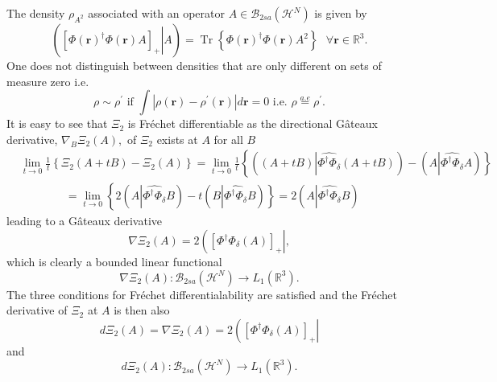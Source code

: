 \documentclass[aps,preprint]{revtex4}%
\begin{document}
The density $\rho_{A^{2}}$ associated with an operator $A\in\mathcal{B}%
_{2sa}\left(  \mathcal{H}^{N}\right)  $ is given by
\begin{equation}
\left(  \left.  \left[  \Phi\left(  \boldsymbol{r}\right)  ^{\dagger}%
\Phi\left(  \boldsymbol{r}\right)  A\right]  _{+}\right\vert A\right)
=\operatorname{Tr}\left\{  \Phi\left(  \boldsymbol{r}\right)  ^{\dagger}%
\Phi\left(  \boldsymbol{r}\right)  A^{2}\right\}  \text{ }\forall
\boldsymbol{r\in}\mathbb{R}^{3}.
\end{equation}
One does not distinguish between densities that are only different on sets of
measure zero i.e.
\begin{equation}
\rho\sim\rho^{\prime}\text{ if }\int\left\vert \rho\left(  \boldsymbol{r}%
\right)  -\rho^{\prime}\left(  \boldsymbol{r}\right)  \right\vert
d\boldsymbol{r}=0\text{ i.e. }\rho\overset{a.e}{=}\rho^{\prime}.
\end{equation}
It is easy to see that $\Xi_{2}$ is Fr\'{e}chet differentiable as the
directional G\^{a}teaux derivative, $\nabla_{B}\Xi_{2}\left(  A\right)  ,$ of
$\Xi_{2}$ exists at $A$ for all $B$
\begin{align}
&  \lim_{t\rightarrow0}\frac{1}{t}\left\{  \Xi_{2}\left(  A+tB\right)
-\Xi_{2}\left(  A\right)  \right\}  =\lim_{t\rightarrow0}\frac{1}{t}\left\{
\left(  \left(  A+tB\right)  \left\vert \widehat{\Phi^{\dagger}\Phi_{\delta}%
}\left(  A+tB\right)  \right.  \right)  -\left(  A\left\vert \widehat{\Phi
^{\dagger}\Phi_{\delta}}A\right.  \right)  \right\} \nonumber\\
&  \left.  \qquad\qquad=\right.  \lim_{t\rightarrow0}\left\{  2\left(
A\left\vert \widehat{\Phi^{\dagger}\Phi_{\delta}}B\right.  \right)  -t\left(
B\left\vert \widehat{\Phi^{\dagger}\Phi_{\delta}}B\right.  \right)  \right\}
=2\left(  A\left\vert \widehat{\Phi^{\dagger}\Phi_{\delta}}B\right.  \right)
\end{align}
leading to a G\^{a}teaux derivative
\begin{equation}
\nabla\Xi_{2}\left(  A\right)  =2\left(  \left[  \Phi^{\dagger}\Phi_{\delta
}\left(  A\right)  \right]  _{+}\right\vert ,
\end{equation}
which is clearly a bounded linear functional
\begin{equation}
\nabla\Xi_{2}\left(  A\right)  :\mathcal{B}_{2sa}\left(  \mathcal{H}%
^{N}\right)  \rightarrow L_{1}\left(  \mathbb{R}^{3}\right)  .
\end{equation}
The three conditions for Fr\'{e}chet differentialability are satisfied and the
Fr\'{e}chet derivative of $\Xi_{2}$ at $A$ is then also
\begin{equation}
d\Xi_{2}\left(  A\right)  =\nabla\Xi_{2}\left(  A\right)  =2\left(  \left[
\Phi^{\dagger}\Phi_{\delta}\left(  A\right)  \right]  _{+}\right\vert
\end{equation}
and
\begin{equation}
d\Xi_{2}\left(  A\right)  :\mathcal{B}_{2sa}\left(  \mathcal{H}^{N}\right)
\rightarrow L_{1}\left(  \mathbb{R}^{3}\right)  .
\end{equation}
\end{document}
